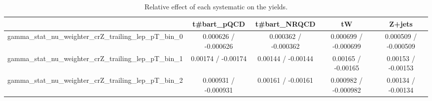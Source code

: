 \documentclass[10pt]{article}
\begin{document}
\begin{table}[htbp]
\begin{center}
\begin{tabular}{|c|c|c|c|c|}
\hline 
      & t#bar{t}_{pQCD}      & t#bar{t}_{NRQCD}      & tW      & Z+jets \\ 
\hline 
  gamma_stat_nu_weighter_crZ_trailing_lep_pT_bin_0 & 0.000626 / -0.000626 & 0.000362 / -0.000362 & 0.000699 / -0.000699 & 0.000509 / -0.000509 \\ 
  gamma_stat_nu_weighter_crZ_trailing_lep_pT_bin_1 & 0.00174 / -0.00174 & 0.00144 / -0.00144 & 0.00165 / -0.00165 & 0.00153 / -0.00153 \\ 
  gamma_stat_nu_weighter_crZ_trailing_lep_pT_bin_2 & 0.000931 / -0.000931 & 0.00161 / -0.00161 & 0.000982 / -0.000982 & 0.00134 / -0.00134 \\ 
\hline 
\end{tabular} 
\caption{Relative effect of each systematic on the yields.} 
\end{center} 
\end{table} 
\end{document}
